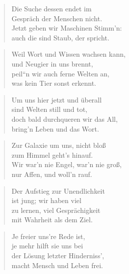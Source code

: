 \documentclass[10pt,a4paper]{article}
\begin{document}
\begin{multicols}{2}
\begin{verse}
Die Suche dessen endet im \\
Gespräch der Menschen nicht. \\
Jetzt geben wir Maschinen Stimm’n: \\
auch die sind Staub, der spricht. \\
\end{verse}

\begin{verse}
Weil Wort und Wissen wachsen kann, \\
und Neugier in uns brennt, \\
peil“n wir auch ferne Welten an, \\
was kein Tier sonst erkennt. \\
\end{verse}

\begin{verse}
Um uns hier jetzt und überall \\
sind Welten still und tot, \\
doch bald durchqueren wir das All, \\
bring’n Leben und das Wort. \\
\end{verse}

\begin{verse}
Zur Galaxie um uns, nicht bloß \\
zum Himmel geht’s hinauf. \\
Wir war’n nie Engel, war’n nie groß, \\
nur Affen, und woll’n rauf. \\
\end{verse}

\begin{verse}
Der Aufstieg zur Unendlichkeit \\
ist jung; wir haben viel \\
zu lernen, viel Gesprächigkeit \\
mit Wahrheit als dem Ziel. \\
\end{verse}

\begin{verse}
Je freier uns’re Rede ist, \\
je mehr hilft sie uns bei \\
der Lösung letzter Hinderniss’, \\
macht Mensch und Leben frei. \\
\end{verse}


\end{multicols}
\end{document}
